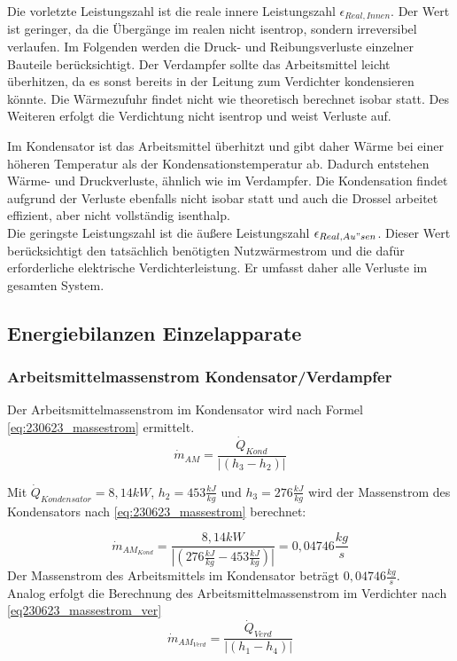 Die vorletzte Leistungszahl ist die reale innere Leistungszahl $\epsilon_{Real,Innen}$.
Der Wert ist geringer, da die Übergänge im realen nicht isentrop, sondern irreversibel verlaufen. 
Im Folgenden werden die Druck- und Reibungsverluste einzelner Bauteile berücksichtigt. 
Der Verdampfer sollte das Arbeitsmittel leicht überhitzen, da es sonst bereits in der Leitung zum Verdichter kondensieren könnte. 
Die Wärmezufuhr findet nicht wie theoretisch berechnet isobar statt.
Des Weiteren erfolgt die Verdichtung nicht isentrop und weist Verluste auf.

Im Kondensator ist das Arbeitsmittel überhitzt und gibt daher Wärme bei einer höheren Temperatur als der Kondensationstemperatur ab. 
Dadurch entstehen Wärme- und Druckverluste, ähnlich wie im Verdampfer. 
Die Kondensation findet aufgrund der Verluste ebenfalls nicht isobar statt
und auch die  Drossel arbeitet effizient, aber nicht vollständig isenthalp.
\\
Die geringste Leistungszahl ist die äußere Leistungszahl $\epsilon_{Real,Au"sen}$. 
Dieser Wert berücksichtigt den tatsächlich benötigten Nutzwärmestrom und die dafür erforderliche elektrische Verdichterleistung. 
Er umfasst daher alle Verluste im gesamten System.

\newpage
\subsection{Energiebilanzen Einzelapparate}
\label{subsec:Massenstrom}
\subsubsection{Arbeitsmittelmassenstrom Kondensator/Verdampfer}
Der Arbeitsmittelmassenstrom im Kondensator wird nach Formel \ref{eq:230623_massestrom} ermittelt.
\begin{equation}
   \dot m_{AM} = \frac{\dot Q_{Kond}}{|(h_3 - h_2)|}
   \label{eq:230623_massestrom}
\end{equation}

Mit $\dot Q_{Kondensator}=8,14kW$, $h_2=453\frac{kJ}{kg}$ und $h_3=276\frac{kJ}{kg}$ wird der Massenstrom des Kondensators nach \autoref*{eq:230623_massestrom} berechnet:

$$ \dot m_{AM_{Kond}} = \frac{8,14kW}{|(276\frac{kJ}{kg} - 453\frac{kJ}{kg})|} = 0,04746 \frac{kg}{s} $$
Der Massenstrom des Arbeitsmittels im Kondensator beträgt $0,04746 \frac{kg}{s}$.
\\
Analog erfolgt die Berechnung des Arbeitsmittelmassenstrom im Verdichter nach \autoref{eq230623_massestrom_ver}
\begin{equation}
  \dot m_{AM_{Verd}} = \frac{\dot Q_{Verd}}{|(h_1-h_4)|}
    \label{eq230623_massestrom_ver}
\end{equation}


